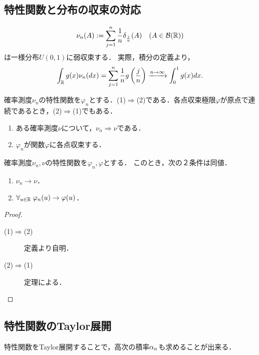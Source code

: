 \documentclass[uplatex,dvipdfmx]{jsreport}
\begin{document}
\subsection{特性関数と分布の収束の対応}

\begin{example}
    \[\nu_n(A):=\sum^n_{j=1}\frac{1}{n}\delta_{\frac{j}{n}}(A)\quad(A\in\mathcal{B}(\mathbb{R}))\]
    は一様分布$U(0,1)$に弱収束する．
    実際，積分の定義より，
    \[\int_{\mathbb{R}} g(x)\nu_n(dx)=\sum^n_{j=1}\frac{1}{n}g\left(\frac{j}{n}\right)\xrightarrow{n\to\infty}\int^1_0g(x)dx.\]
\end{example}

\begin{theorem}
    確率測度$\nu_n$の特性関数を$\varphi_n$とする．(1)$\Rightarrow$(2)である．各点収束極限$\varphi$が原点で連続であるとき，(2)$\Rightarrow$(1)でもある．
    \begin{enumerate}
        \item ある確率測度$\nu$について，$\nu_n\Rightarrow\nu$である．
        \item $\varphi_n$が関数$\varphi$に各点収束する．
    \end{enumerate}
\end{theorem}

\begin{corollary}[Glivenko]
    確率測度$\nu_n,\nu$の特性関数を$\varphi_n,\varphi$とする．
    このとき，次の２条件は同値．
    \begin{enumerate}
        \item $\nu_n\to\nu$．
        \item $\forall_{u\in\mathbb{R}}\;\varphi_n(u)\to\varphi(u)$．
    \end{enumerate}
\end{corollary}
\begin{proof}\mbox{}
    \begin{description}
        \item[(1)$\Rightarrow$(2)] 定義より自明．
        \item[(2)$\Rightarrow$(1)] 定理による．
    \end{description}
\end{proof}

\subsection{特性関数のTaylor展開}

\begin{tcolorbox}[colframe=ForestGreen, colback=ForestGreen!10!white,breakable,colbacktitle=ForestGreen!40!white,coltitle=black,fonttitle=\bfseries\sffamily,
title=]
    特性関数をTaylor展開することで，高次の積率$\alpha_n$も求めることが出来る．
\end{tcolorbox}
\end{document}
